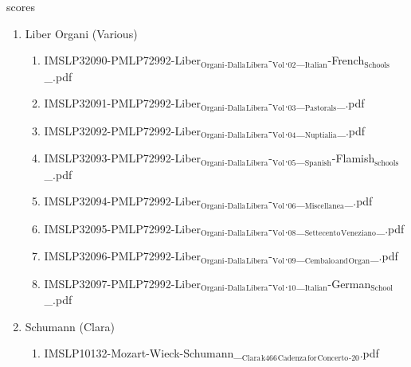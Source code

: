 \documentclass[11pt]{article}
\begin{document}
\item scores
\label{sec-1-1-1-1-44}
\begin{enumerate}
\item Liber Organi (Various)
\label{sec-1-1-1-1-44-1}
\begin{enumerate}
\item IMSLP32090-PMLP72992-Liber$_{\text{Organi}}$$_{\text{-Dalla}}$$_{\text{Libera}}$-$_{\text{Vol}}$.$_{\text{02}}$\_$_{\text{Italian}}$-French$_{\text{Schools}}$\_.pdf
\label{sec-1-1-1-1-44-1-1}

\item IMSLP32091-PMLP72992-Liber$_{\text{Organi}}$$_{\text{-Dalla}}$$_{\text{Libera}}$-$_{\text{Vol}}$.$_{\text{03}}$\_$_{\text{Pastorals}}$\_.pdf
\label{sec-1-1-1-1-44-1-2}

\item IMSLP32092-PMLP72992-Liber$_{\text{Organi}}$$_{\text{-Dalla}}$$_{\text{Libera}}$-$_{\text{Vol}}$.$_{\text{04}}$\_$_{\text{Nuptialia}}$\_.pdf
\label{sec-1-1-1-1-44-1-3}

\item IMSLP32093-PMLP72992-Liber$_{\text{Organi}}$$_{\text{-Dalla}}$$_{\text{Libera}}$-$_{\text{Vol}}$.$_{\text{05}}$\_$_{\text{Spanish}}$-Flamish$_{\text{schools}}$\_.pdf
\label{sec-1-1-1-1-44-1-4}

\item IMSLP32094-PMLP72992-Liber$_{\text{Organi}}$$_{\text{-Dalla}}$$_{\text{Libera}}$-$_{\text{Vol}}$.$_{\text{06}}$\_$_{\text{Miscellanea}}$\_.pdf
\label{sec-1-1-1-1-44-1-5}

\item IMSLP32095-PMLP72992-Liber$_{\text{Organi}}$$_{\text{-Dalla}}$$_{\text{Libera}}$-$_{\text{Vol}}$.$_{\text{08}}$\_$_{\text{Settecento}}$$_{\text{Veneziano}}$\_.pdf
\label{sec-1-1-1-1-44-1-6}

\item IMSLP32096-PMLP72992-Liber$_{\text{Organi}}$$_{\text{-Dalla}}$$_{\text{Libera}}$-$_{\text{Vol}}$.$_{\text{09}}$\_$_{\text{Cembalo}}$$_{\text{and}}$$_{\text{Organ}}$\_.pdf
\label{sec-1-1-1-1-44-1-7}

\item IMSLP32097-PMLP72992-Liber$_{\text{Organi}}$$_{\text{-Dalla}}$$_{\text{Libera}}$-$_{\text{Vol}}$.$_{\text{10}}$\_$_{\text{Italian}}$-German$_{\text{School}}$\_.pdf
\label{sec-1-1-1-1-44-1-8}
\end{enumerate}

\item Schumann (Clara)
\label{sec-1-1-1-1-44-2}
\begin{enumerate}
\item IMSLP10132-Mozart-Wieck-Schumann\_$_{\text{Clara}}$$_{\text{k466}}$$_{\text{Cadenza}}$$_{\text{for}}$$_{\text{Concerto}}$$_{\text{-20}}$.pdf
\label{sec-1-1-1-1-44-2-1}
\end{enumerate}


\end{enumerate}
\end{document}
